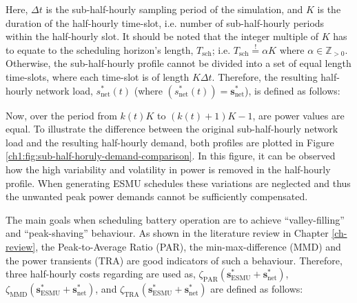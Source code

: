 Here, $\Delta t$ is the sub-half-hourly sampling period of the simulation, and $K$ is the duration of the half-hourly time-slot, i.e. number of sub-half-hourly periods within the half-hourly slot.
It should be noted that the integer multiple of $K$ has to equate to the scheduling horizon's length, $T_\text{sch}$; i.e. $T_\text{sch} \overset{!}{=} \alpha K \text{ where } \alpha \in \mathbb{Z}_{>0}$.
Otherwise, the sub-half-hourly profile cannot be divided into a set of equal length time-slots, where each time-slot is of length $K\Delta t$.
Therefore, the resulting half-hourly network load, $s^{*}_\text{net}(t)$ (where $(s^*_\text{net}(t)) = \textbf{s}^*_\text{net}$), is defined as follows:



Now, over the period from $k(t)K$ to $(k(t)+1)K-1$, are power values are equal.
To illustrate the difference between the original sub-half-hourly network load and the resulting half-hourly demand, both profiles are plotted in Figure \ref{ch1:fig:sub-half-horuly-demand-comparison}.
In this figure, it can be observed how the high variability and volatility in power is removed in the half-hourly profile.
When generating ESMU schedules these variations are neglected and thus the unwanted peak power demands cannot be sufficiently compensated.



The main goals when scheduling battery operation are to achieve ``valley-filling'' and ``peak-shaving'' behaviour.
As shown in the literature review in Chapter \ref{ch-review}, the Peak-to-Average Ratio (PAR), the min-max-difference (MMD) and the power transients (TRA) are good indicators of such a behaviour.
Therefore, three half-hourly costs regarding are used as, $\zeta_\text{PAR}(\textbf{s}^*_\text{ESMU} + \textbf{s}^*_\text{net})$, $\zeta_\text{MMD}(\textbf{s}^*_\text{ESMU} + \textbf{s}^*_\text{net})$, and $\zeta_\text{TRA}(\textbf{s}^*_\text{ESMU} + \textbf{s}^*_\text{net})$ are defined as follows:








